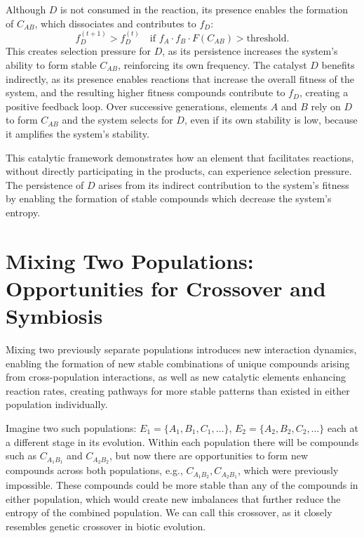 \documentclass[entropy,article,submit,pdftex,moreauthors]{Definitions/mdpi}
\begin{document}
Although \( D \) is not consumed in the reaction, its presence enables the formation of \( C_{AB} \), which dissociates and contributes to \( f_D \):
\[
f_D^{(t+1)} > f_D^{(t)} \quad \text{if } f_A \cdot f_B \cdot F(C_{AB}) > \text{threshold}.
\]
This creates selection pressure for \( D \), as its persistence increases the system's ability to form stable \( C_{AB} \), reinforcing its own frequency. The catalyst \( D \) benefits indirectly, as its presence enables reactions that increase the overall fitness of the system, and the resulting higher fitness compounds contribute to \( f_D \), creating a positive feedback loop. Over successive generations, elements \( A \) and \( B \) rely on \( D \) to form \( C_{AB} \) and the system selects for \( D \), even if its own stability is low, because it amplifies the system's stability.

This catalytic framework demonstrates how an element that facilitates reactions, without directly participating in the products, can experience selection pressure. The persistence of \( D \) arises from its indirect contribution to the system's fitness by enabling the formation of stable compounds which decrease the system's entropy.

\section{Mixing Two Populations: Opportunities for Crossover and Symbiosis}

Mixing two previously separate populations introduces new interaction dynamics, enabling the formation of new stable combinations of unique compounds arising from cross-population interactions, as well as new catalytic elements enhancing reaction rates, creating pathways for more stable patterns than existed in either population individually.

Imagine two such populations: \( E_1 = \{A_1, B_1, C_1, \dots\} \), \( E_2 = \{A_2, B_2, C_2, \dots\} \) each at a different stage in its evolution. Within each population there will be compounds such as \( C_{A_1B_1} \) and \( C_{A_2B_2} \), but now there are opportunities to form new compounds across both populations, e.g., \( C_{A_1B_2}, C_{A_2B_1} \), which were previously impossible. These compounds could be more stable than any of the compounds in either population, which would create new imbalances that further reduce the entropy of the combined population. We can call this crossover, as it closely resembles genetic crossover in biotic evolution.
\end{document}
